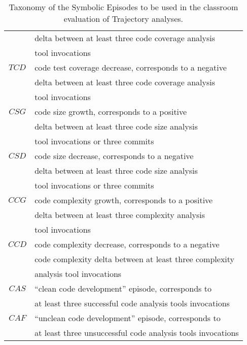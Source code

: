 \begin{table}
\begin{center}
\begin{tabular}{ | c | l | }
													& delta between at least three code coverage analysis \\
													& tool invocations \\
		\hline
		$TCD$ 								& code test coverage decrease, corresponds to a negative \\
													& delta between at least three code coverage analysis \\
													& tool invocations \\
		\hline
		$CSG$ 								& code size growth, corresponds to a positive \\
													& delta between at least three code size analysis \\
													& tool invocations or three commits \\
		\hline
		$CSD$ 								& code size decrease, corresponds to a negative \\
													& delta between at least three code size analysis \\
													& tool invocations or three commits \\																										
		\hline
		$CCG$ 								& code complexity growth, corresponds to a positive \\
													& delta between at least three complexity analysis \\
													& tool invocations \\
		\hline
		$CCD$ 								& code complexity decrease, corresponds to a negative \\
													& code complexity delta between at least three complexity \\
													& analysis tool invocations \\													
		\hline
		$CAS$ 								& ``clean code development'' episode, corresponds to \\
													& at least three successful code analysis tools invocations \\
		\hline
		$CAF$ 								& ``unclean code development'' episode, corresponds to \\
													& at least three unsuccessful code analysis tools invocations \\
		\hline		
	  \end{tabular}
    \caption{Taxonomy of the Symbolic Episodes to be used in the classroom evaluation of Trajectory analyses.}
    \label{fig:data_collected_intervals}
    \end{center}
\end{table}

